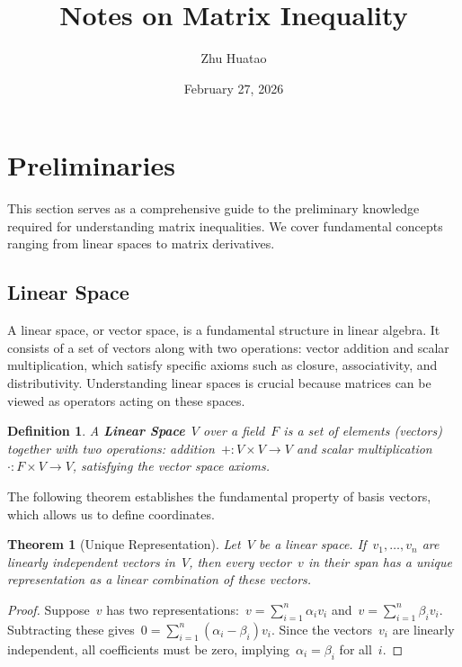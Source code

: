 \documentclass[12pt]{article}
\title{Notes on Matrix Inequality}
\author{Zhu Huatao}
\date{February 27, 2026}
\newtheorem{theorem}{Theorem}[section]
\newtheorem{definition}{Definition}[section]
\begin{document}
\maketitle

\section{Preliminaries}

This section serves as a comprehensive guide to the preliminary knowledge required for understanding matrix inequalities. We cover fundamental concepts ranging from linear spaces to matrix derivatives.

\subsection{Linear Space}

A linear space, or vector space, is a fundamental structure in linear algebra. It consists of a set of vectors along with two operations: vector addition and scalar multiplication, which satisfy specific axioms such as closure, associativity, and distributivity. Understanding linear spaces is crucial because matrices can be viewed as operators acting on these spaces.

\begin{definition}
    A \textbf{Linear Space}~$V$ over a field~$F$ is a set of elements (vectors) together with two operations: addition~$+: V \times V \to V$ and scalar multiplication~$\cdot: F \times V \to V$, satisfying the vector space axioms.
\end{definition}

The following theorem establishes the fundamental property of basis vectors, which allows us to define coordinates.

\begin{theorem}[Unique Representation]
    Let~$V$ be a linear space. If~$v_1, \dots, v_n$ are linearly independent vectors in~$V$, then every vector~$v$ in their span has a unique representation as a linear combination of these vectors.
\end{theorem}

\begin{proof}
    Suppose~$v$ has two representations:~$v = \sum_{i=1}^n \alpha_i v_i$ and~$v = \sum_{i=1}^n \beta_i v_i$. Subtracting these gives~$0 = \sum_{i=1}^n (\alpha_i - \beta_i) v_i$. Since the vectors~$v_i$ are linearly independent, all coefficients must be zero, implying~$\alpha_i = \beta_i$ for all~$i$.
\end{proof}
\end{document}
